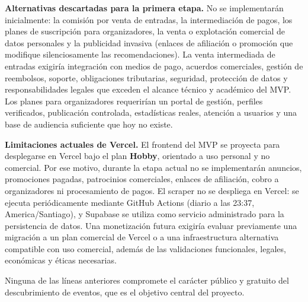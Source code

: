 \textbf{Alternativas descartadas para la primera etapa.} No se implementarán
inicialmente: la comisión por venta de entradas, la intermediación de pagos, los planes
de suscripción para organizadores, la venta o explotación comercial de datos personales
y la publicidad invasiva (enlaces de afiliación o promoción que modifique silenciosamente
las recomendaciones). La venta intermediada de entradas exigiría integración con medios
de pago, acuerdos comerciales, gestión de reembolsos, soporte, obligaciones tributarias,
seguridad, protección de datos y responsabilidades legales que exceden el alcance técnico
y académico del MVP. Los planes para organizadores requerirían un portal de gestión,
perfiles verificados, publicación controlada, estadísticas reales, atención a usuarios y
una base de audiencia suficiente que hoy no existe.

\textbf{Limitaciones actuales de Vercel.} El frontend del MVP se proyecta para
desplegarse en Vercel bajo el plan \textbf{Hobby}, orientado a uso personal y no
comercial. Por ese motivo, durante la etapa actual no se implementarán anuncios,
promociones pagadas, patrocinios comerciales, enlaces de afiliación, cobro a
organizadores ni procesamiento de pagos. El scraper no se despliega en Vercel: se ejecuta
periódicamente mediante GitHub Actions (diario a las 23:37, America/Santiago), y Supabase
se utiliza como servicio administrado para la persistencia de datos. Una monetización
futura exigiría evaluar previamente una migración a un plan comercial de Vercel o a una
infraestructura alternativa compatible con uso comercial, además de las validaciones
funcionales, legales, económicas y éticas necesarias.

Ninguna de las líneas anteriores compromete el carácter público y gratuito del
descubrimiento de eventos, que es el objetivo central del proyecto.
